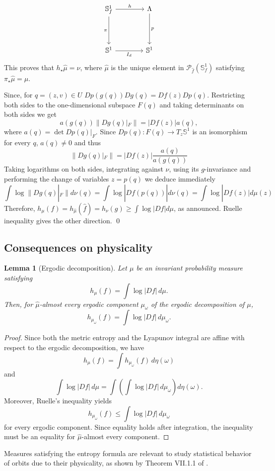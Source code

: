 \documentclass[12pt,a4paper,twoside]{article}
\theoremstyle{plain}
\newtheorem{lemma}[theorem]{Lemma}
\theoremstyle{definition}
\newcommand{\T}{{\mathbb{S}^1}}
\newcommand{\Tf}{{\mathbb{S}_f^1}}
\newcommand{\cP}{{\mathcal P}}
\newcommand{\hf}{\hat{f}}
\begin{document}
\[
\begin{tikzcd}[column sep=4em, row sep=4em]
\Tf
  \arrow[r, "h"]
  \arrow[d, "\pi"']
&
\Lambda
  \arrow[d, "p"]
\\
\T
  \arrow[r, "I_d"']
&
\T
\end{tikzcd}
\]
This proves that $h_{\star}\hat{\mu}=\nu$, where $\hat{\mu}$ is the unique element in $\cP_{\hf}(\Tf)$ satisfying $\pi_{\star}\hat{\mu}=\mu$. 

Since, for $q=(z,v)\in U$ $Dp(g(q))Dg(q)=Df(z)Dp(q)$. Restricting both sides to the one-dimensional subspace $F(q)$ and taking determinants on both sides we get
\[
a(g(q))\|Dg(q)|_F\|=|Df(z)|a(q),
\]
where $a(q)=\det Dp(q)|_{F}$. Since $Dp(q): F(q)\to T_z\T$ is an isomorphism for every $q$, $a(q)\neq 0$ and thus
\[
\|Dg(q)|_F\|=|Df(z)|\frac{a(q)}{a(g(q))}
\]
Taking logarithms on both sides, integrating against $\nu$, using its $g$-invariance and performing the change of variables $z=p(q)$ we deduce immediately 
\[
\int\log\|Dg(q)|_F\|d\nu(q)=\int\log|Df(p(q))|d\nu(q)=\int\log|Df(z)|d\mu(z)
\]
Therefore, $h_{\mu}(f)=h_{\hat{\mu}}(\hf)=h_\nu(g)\geq\int\log|Df|d\mu$, as announced. Ruelle inequality gives the other direction. \qed


\subsection{Consequences on physicality}

\begin{lemma}[Ergodic decomposition]
\label{lem:decomposicao}
Let $\mu$ be an invariant probability measure satisfying
\[
h_\mu(f)=\int\log|Df|\,d\mu.
\]
Then, for $\hat\mu$-almost every ergodic component $\mu_\omega$ of the ergodic decomposition of $\mu$,
\[
h_{\mu_\omega}(f)=\int\log|Df|\,d\mu_\omega.
\]  
\end{lemma}
\begin{proof}
Since both the metric entropy and the Lyapunov integral are affine with respect to the ergodic decomposition, we have
\[
h_\mu(f)
=
\int h_{\mu_\omega}(f)\,d\eta(\omega)
\]
and
\[
\int\log|Df|\,d\mu
=
\int
\left(
\int\log|Df|\,d\mu_\omega
\right)
d\eta(\omega).
\]
Moreover, Ruelle's inequality yields
\[
h_{\mu_\omega}(f)
\le
\int\log|Df|\,d\mu_\omega
\]
for every ergodic component. Since equality holds after integration, the inequality must be an equality for $\hat\mu$-almost every component.
\end{proof}

Measures satisfying the entropy formula are relevant to study statistical behavior of orbits due to their physicality, as shown by Theorem VII.1.1 of \cite{quianetc}.
\end{document}
